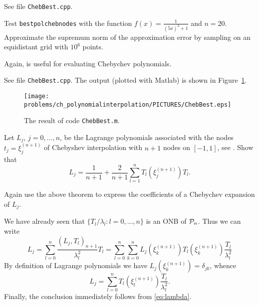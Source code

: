 \begin{problem}
\begin{subproblem}[2]
\begin{solution}
See file \texttt{ChebBest.cpp}.
\end{solution}
\end{subproblem}

\begin{subproblem}[2] 
Test \texttt{bestpolchebnodes} with the function $f(x)=\frac{1}{(5x)^2+1}$ and
$n=20$. Approximate the supremum norm of the approximation error by sampling on an
equidistant grid with $10^{6}$ points. 

\begin{hint}
  Again,  is useful for evaluating Chebychev polynomials. 
\end{hint}


   \begin{solution}
See file \texttt{ChebBest.cpp}. The output (plotted with Matlab) is shown in Figure~\ref{fig:ChebBest}.
\begin{figure}\begin{center}
\texttt{[image: \\problems/ch\_polynomialinterpolation/PICTURES/ChebBest.eps]}
\caption{The result of code \texttt{ChebBest.m}.}
\label{fig:ChebBest}
\end{center}\end{figure}
\end{solution}
\end{subproblem}

\begin{subproblem}[2] 
Let $L_j$, $j=0,\dots,n$, be the Lagrange polynomials associated with the nodes
$t_j=\xi^{(n+1)}_{j}$ of Chebyshev interpolation with $n+1$ nodes on $[-1,1]$, see
. Show that
\[
L_j = \frac{1}{n+1} + \frac{2}{n+1} \sum_{l=1}^n T_l(\xi^{(n+1)}_{j}) T_l.
\]

\begin{hint}
  Again use the above theorem to express the coefficients of a Chebychev expansion
  of  $L_{j}$. 
\end{hint}

   \begin{solution}
We have already seen that $\{T_l/\lambda_l:l=0,\dots,n\}$ is an ONB of ${\cal P}_{n}$. Thus we can write
\[
L_j=\sum_{l=0}^n \frac{(L_j,T_l)_{n+1}}{\lambda_l^2} T_l =\sum_{l=0}^n \sum_{k=0}^n L_j(\xi^{(n+1)}_{k}) T_l(\xi^{(n+1)}_{k}) \frac{T_l}{\lambda_l^2} 
\]
By definition of Lagrange polynomials we have $ L_j(\xi^{(n+1)}_{k}) = \delta_{jk}$, whence
\[
L_j=\sum_{l=0}^n  T_l(\xi^{(n+1)}_{l}) \frac{T_l}{\lambda_l^2}.
\]
Finally, the conclusion immediately follows from \eqref{eq:lambda}.
\end{solution}
\end{subproblem}

\end{problem}




